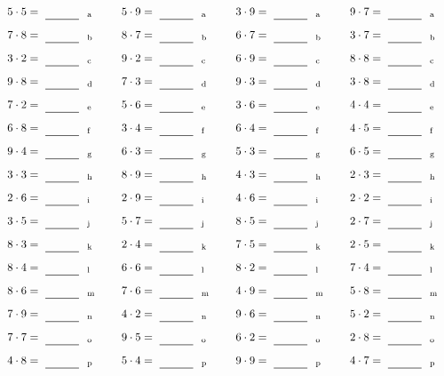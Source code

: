 \documentclass
[
  draft    = true,
  fontsize = 11pt,
  parskip  = half-
]
{scrartcl}
\begin{document}
\par\vfill\par
\begin{align*}
    \pline{5\cdot5}&=\rline{a}
  & \pline{5\cdot9}&=\rline{a}
  & \pline{3\cdot9}&=\rline{a}
  & \pline{9\cdot7}&=\rline{a} \\[1ex]
    \pline{7\cdot8}&=\rline{b}
  & \pline{8\cdot7}&=\rline{b}
  & \pline{6\cdot7}&=\rline{b}
  & \pline{3\cdot7}&=\rline{b} \\[1ex]
    \pline{3\cdot2}&=\rline{c}
  & \pline{9\cdot2}&=\rline{c}
  & \pline{6\cdot9}&=\rline{c}
  & \pline{8\cdot8}&=\rline{c} \\[1ex]
    \pline{9\cdot8}&=\rline{d}
  & \pline{7\cdot3}&=\rline{d}
  & \pline{9\cdot3}&=\rline{d}
  & \pline{3\cdot8}&=\rline{d} \\[1ex]
    \pline{7\cdot2}&=\rline{e}
  & \pline{5\cdot6}&=\rline{e}
  & \pline{3\cdot6}&=\rline{e}
  & \pline{4\cdot4}&=\rline{e} \\[1ex]
    \pline{6\cdot8}&=\rline{f}
  & \pline{3\cdot4}&=\rline{f}
  & \pline{6\cdot4}&=\rline{f}
  & \pline{4\cdot5}&=\rline{f} \\[1ex]
    \pline{9\cdot4}&=\rline{g}
  & \pline{6\cdot3}&=\rline{g}
  & \pline{5\cdot3}&=\rline{g}
  & \pline{6\cdot5}&=\rline{g} \\[1ex]
    \pline{3\cdot3}&=\rline{h}
  & \pline{8\cdot9}&=\rline{h}
  & \pline{4\cdot3}&=\rline{h}
  & \pline{2\cdot3}&=\rline{h} \\[1ex]
    \pline{2\cdot6}&=\rline{i}
  & \pline{2\cdot9}&=\rline{i}
  & \pline{4\cdot6}&=\rline{i}
  & \pline{2\cdot2}&=\rline{i} \\[1ex]
    \pline{3\cdot5}&=\rline{j}
  & \pline{5\cdot7}&=\rline{j}
  & \pline{8\cdot5}&=\rline{j}
  & \pline{2\cdot7}&=\rline{j} \\[1ex]
    \pline{8\cdot3}&=\rline{k}
  & \pline{2\cdot4}&=\rline{k}
  & \pline{7\cdot5}&=\rline{k}
  & \pline{2\cdot5}&=\rline{k} \\[1ex]
    \pline{8\cdot4}&=\rline{l}
  & \pline{6\cdot6}&=\rline{l}
  & \pline{8\cdot2}&=\rline{l}
  & \pline{7\cdot4}&=\rline{l} \\[1ex]
    \pline{8\cdot6}&=\rline{m}
  & \pline{7\cdot6}&=\rline{m}
  & \pline{4\cdot9}&=\rline{m}
  & \pline{5\cdot8}&=\rline{m} \\[1ex]
    \pline{7\cdot9}&=\rline{n}
  & \pline{4\cdot2}&=\rline{n}
  & \pline{9\cdot6}&=\rline{n}
  & \pline{5\cdot2}&=\rline{n} \\[1ex]
    \pline{7\cdot7}&=\rline{o}
  & \pline{9\cdot5}&=\rline{o}
  & \pline{6\cdot2}&=\rline{o}
  & \pline{2\cdot8}&=\rline{o} \\[1ex]
    \pline{4\cdot8}&=\rline{p}
  & \pline{5\cdot4}&=\rline{p}
  & \pline{9\cdot9}&=\rline{p}
  & \pline{4\cdot7}&=\rline{p}
\end{align*}
\end{document}
